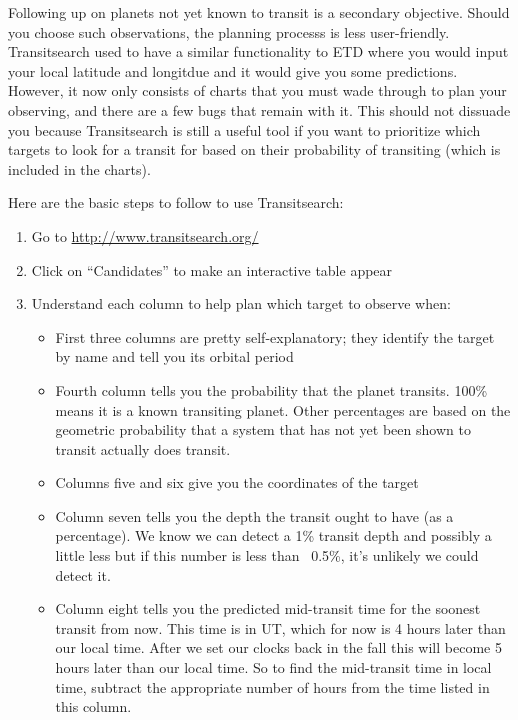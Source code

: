 \documentclass[12pt, preprint]{aastex}
\begin{document}
Following up on planets not yet known to transit is a secondary objective.  Should you choose such observations, the planning processs is less user-friendly.  Transitsearch used to have a similar functionality to ETD where you would input your local latitude and longitdue and it would give you some predictions.  However, it now only consists of charts that you must wade through to plan your observing, and there are a few bugs that remain with it.  This should not dissuade you because Transitsearch is still a useful tool if you want to prioritize which targets to look for a transit for based on their probability of transiting (which is included in the charts).

Here are the basic steps to follow to use Transitsearch:

\begin{enumerate}
\item Go to \url{http://www.transitsearch.org/}

\item Click on ``Candidates'' to make an interactive table appear

\item Understand each column to help plan which target to observe when:

\begin{itemize}
\item First three columns are pretty self-explanatory; they identify the target by name and tell you its orbital period

\item Fourth column tells you the probability that the planet transits.  100\% means it is a known transiting planet.  Other percentages are based on the geometric probability that a system that has not yet been shown to transit actually does transit.

\item Columns five and six give you the coordinates of the target

\item Column seven tells you the depth the transit ought to have (as a percentage).  We know we can detect a 1\% transit depth and possibly a little less but if this number is less than ~0.5\%, it's unlikely we could detect it.

\item Column eight tells you the predicted mid-transit time for the soonest transit from now.  This time is in UT, which for now is 4 hours later than our local time.  After we set our clocks back in the fall this will become 5 hours later than our local time.  So to find the mid-transit time in local time, subtract the appropriate number of hours from the time listed in this column.


\end{itemize}
\end{enumerate}
\end{document}
